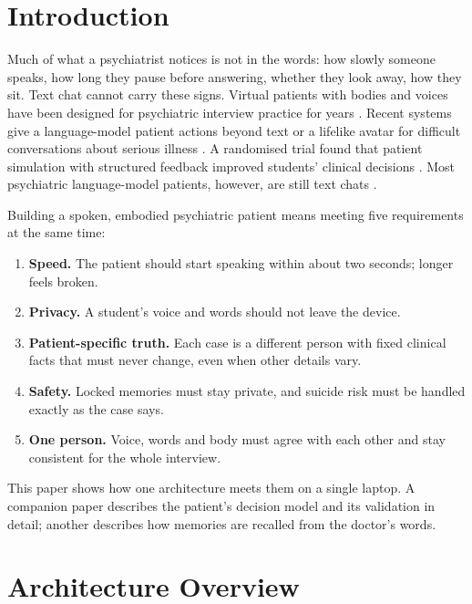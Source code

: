 \documentclass[journal]{IEEEtran}
\begin{document}
\section{Introduction}
Much of what a psychiatrist notices is not in the words: how slowly someone speaks, how long they pause before answering, whether they look
away, how they sit. Text chat cannot carry these signs. Virtual patients with bodies and voices have been designed for psychiatric interview
practice for years \cite{dupuy2020guidelines}. Recent systems give a language-model patient actions beyond text \cite{voigt2025llmpowered} or a lifelike avatar for difficult conversations about serious illness \cite{haut2025ai}. A randomised trial found that patient simulation with structured feedback improved students' clinical decisions \cite{brugge2024llm}. Most psychiatric language-model patients, however, are still
text chats \cite{wang2024patient,lee2025psyche,sabour2026patientact}.

Building a spoken, embodied psychiatric patient means meeting five requirements at the same time:
\begin{enumerate}
\item \textbf{Speed.} The patient should start speaking within about two seconds; longer feels broken.
\item \textbf{Privacy.} A student's voice and words should not leave the device.
\item \textbf{Patient-specific truth.} Each case is a different person with fixed clinical facts that must never change, even when other
details vary.
\item \textbf{Safety.} Locked memories must stay private, and suicide risk must be handled exactly as the case says.
\item \textbf{One person.} Voice, words and body must agree with each other and stay consistent for the whole interview.
\end{enumerate}
This paper shows how one architecture meets them on a single laptop. A companion paper describes the patient's decision model and its
validation in detail; another describes how memories are recalled from the doctor's words.

\section{Architecture Overview}
\end{document}
